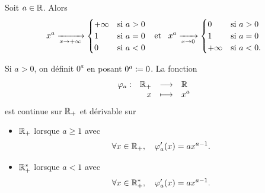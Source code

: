 \documentclass{magnolia}
\begin{document}


\begin{proposition}[utile=-3]
Soit $a\in\mathbb{R}$. Alors
\[x^a \xrightarrow[x\rightarrow +\infty]{}
  \begin{cases}
  +\infty & \text{si $a>0$}\\
  1 & \text{si $a=0$}\\
  0 & \text{si $a<0$}
  \end{cases} \quad\!\text{et}\quad\!
  x^a \xrightarrow[x\rightarrow 0]{}
  \begin{cases}
  0 & \text{si $a>0$}\\
  1 & \text{si $a=0$}\\
  +\infty & \text{si $a<0$.}
  \end{cases}\]
\end{proposition}


\begin{remarqueUnique}
\remarque Si $a>0$, on définit $0^a$ en posant $0^a\coloneqq 0$. La fonction
  \[\begin{array}[t]{lrcl} \displaystyle{\varphi_a} : & \displaystyle{\mathbb{R}_+} & \longrightarrow & \displaystyle{\mathbb{R}} \\ & \displaystyle{x} & \longmapsto & \displaystyle{x^a} \end{array}\]
  est continue sur $\mathbb{R}_+$ et dérivable sur
  \begin{itemize}
  \item $\mathbb{R}_+$ lorsque $a\geq 1$ avec
    \[\forall x\in\mathbb{R}_+ ,\quad \varphi_a'(x)=a x^{a-1}.\]
  \item $\mathbb{R}_+^*$ lorsque $a<1$ avec
    \[\forall x\in\mathbb{R}_+^* ,\quad \varphi_a'(x)=a x^{a-1}.\]
  \end{itemize}
\end{remarqueUnique}
\end{document}
